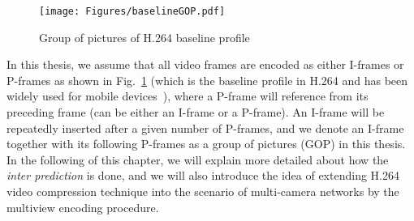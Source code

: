 %
\begin{figure}
\begin{center}
\texttt{[image: Figures/baselineGOP.pdf]}
\caption{\label{fig::baselineGOP}Group of pictures of H.264 baseline profile}
\end{center}
\end{figure}
%
In this thesis, we assume that all video frames are encoded as either I-frames or P-frames as shown in Fig.~\ref{fig::baselineGOP} (which is the baseline profile in H.264 and has been widely used for mobile devices~\cite{h264Recommendation}), where a P-frame will reference from its preceding frame (can be either an I-frame or a P-frame).
An I-frame will be repeatedly inserted after a given number of P-frames, and we denote an I-frame together with its following P-frames as a group of pictures (GOP) in this thesis.
In the following of this chapter, we will explain more detailed about how the \emph{inter prediction} is done, and we will also introduce the idea of extending H.264 video compression technique into the scenario of multi-camera networks by the multiview encoding procedure.